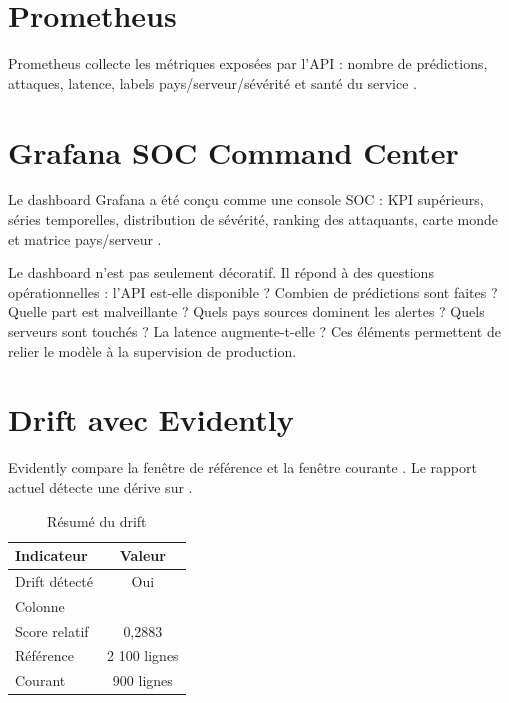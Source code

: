 \section{Prometheus}
Prometheus collecte les métriques exposées par l'API : nombre de prédictions, attaques, latence, labels pays/serveur/sévérité et santé du service \cite{prometheus_python}.


\section{Grafana SOC Command Center}
Le dashboard Grafana a été conçu comme une console SOC : KPI supérieurs, séries temporelles, distribution de sévérité, ranking des attaquants, carte monde et matrice pays/serveur \cite{grafana_best_practices}.

Le dashboard n'est pas seulement décoratif. Il répond à des questions opérationnelles : l'API est-elle disponible ? Combien de prédictions sont faites ? Quelle part est malveillante ? Quels pays sources dominent les alertes ? Quels serveurs sont touchés ? La latence augmente-t-elle ? Ces éléments permettent de relier le modèle à la supervision de production.


\section{Drift avec Evidently}
Evidently compare la fenêtre de référence et la fenêtre courante \cite{evidently_drift}. Le rapport actuel détecte une dérive sur .

\begin{table}[H]
\centering
\caption{Résumé du drift}
\label{tab:drift}
\begin{tabularx}{0.75\linewidth}{@{}lC@{}}
\toprule
\textbf{Indicateur} & \textbf{Valeur}\\
\midrule
Drift détecté & Oui\\
Colonne & \\
Score relatif & 0,2883\\
Référence & 2 100 lignes\\
Courant & 900 lignes\\
\bottomrule
\end{tabularx}
\end{table}

